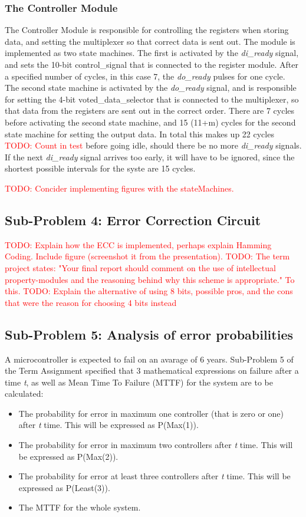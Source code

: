 \documentclass[a4paper]{IEEEtran}
\newcommand\TODO[1]{\textcolor{red}{TODO:#1}}
\newcommand\todo[1]{\TODO{#1}}
\begin{document}
\subsubsection{The Controller Module}
The Controller Module is responsible for controlling the registers when storing data, and setting the multiplexer so that correct data is sent out.
The module is implemented as two state machines.
The first is activated by the \textit{di\_ready} signal, and sets the 10-bit control\_signal that is connected to the register module.
After a specified number of cycles, in this case 7, the \textit{do\_ready} pulses for one cycle.
The second state machine is activated by the \textit{do\_ready} signal, and is responsible for setting the 4-bit voted\_data\_selector that is connected to the multiplexer, so that data from the registers are sent out in the correct order.
There are 7 cycles before activating the second state machine, and 15 (11+m) cycles for the second state machine for setting the output data. 
In total this makes up 22 cycles \todo{ Count in test} before going idle, should there be no more \textit{di\_ready} signals.
If the next \textit{di\_ready} signal arrives too early, it will have to be ignored, since the shortest possible intervals for the syste are 15 cycles.

\todo{ Concider implementing figures with the stateMachines.}

\subsection{Sub-Problem 4: Error Correction Circuit}
\todo{ Explain how the ECC is implemented, perhaps explain Hamming Coding. Include figure (screenshot it from the presentation). }
\break
\break
\todo{ The term project states: "Your final report should comment on the use of intellectual property-modules and the reasoning behind why this scheme is appropriate." To this.}
\break
\break
\todo{ Explain the alternative of using 8 bits, possible pros, and the cons that were the reason for choosing 4 bits instead} 
\break
\break

\subsection{Sub-Problem 5: Analysis of error probabilities}
A microcontroller is expected to fail on an avarage of 6 years.
Sub-Problem 5 of the Term Assignment specified that 3 mathematical expressions on failure after a time \textit{t}, as well as Mean Time To Failure (MTTF) for the system are to be calculated:
\begin{itemize}
    \item The probability for error in maximum one controller (that is zero or one) after \textit{t} time. This will be expressed as P(Max(1)). 
    \item The probability for error in maximum two controllers after \textit{t} time. This will be expressed as P(Max(2)).
    \item The probability for error at least three controllers after \textit{t} time. This will be expressed as P(Least(3)).
    \item The MTTF for the whole system.
\end{itemize}
\end{document}
